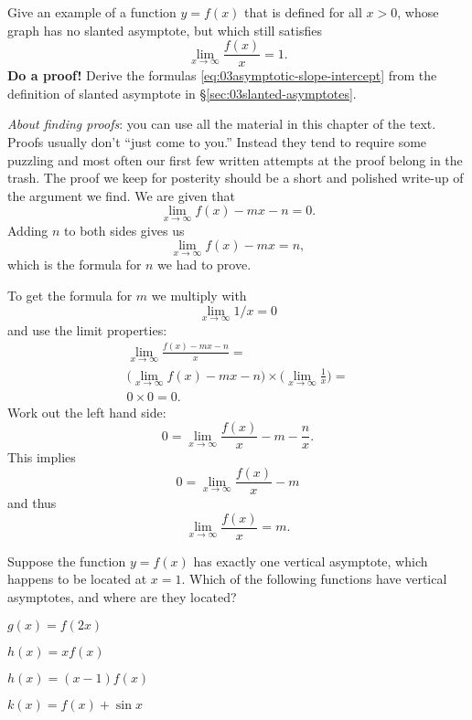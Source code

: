 \begin{multicols}{2}
\problem Give an example of a function $y=f(x)$ that is defined for 
all $x>0$, whose graph has no slanted asymptote, but which still satisfies
\[
\lim_{x\to\infty} \frac{f(x)}{x} = 1.
\]
\problem \textbf{Do a proof!}  Derive the formulas 
\eqref{eq:03asymptotic-slope-intercept}
\label{ex:prove-asymptotic-slope-intercept}
from the definition of slanted asymptote in
\S\ref{sec:03slanted-asymptotes}.

\textit{About finding proofs}:  you can use all the material in this chapter of
the text.  Proofs usually don't ``just come to you.'' Instead they tend to
require some puzzling and most often our first few written attempts at the proof
belong in the trash.  The proof we keep for posterity should be a short and
polished write-up of the argument we find.
\answer 
We are given that
\[
\lim_{x\to\infty} f(x) - mx-n = 0.
\]
Adding $n$ to both sides gives us
\[
\lim_{x\to\infty} f(x) -mx = n,
\]
which is the formula for $n$ we had to prove.

To get the formula for $m$ we multiply with
\[
\lim_{x\to\infty} 1/x =
0
\]
and use the limit properties:
\begin{multline*}
  \lim_{x\to\infty} \frac{f(x)-mx-n}{x} = \\
  \bigl(\lim_{x\to\infty} f(x)-mx-n\bigr)\times
  \bigl(\lim_{x\to\infty}\frac{1}{x}\bigr)=\\
  0\times0 = 0.
\end{multline*}
Work out the left hand side:
\[
0 = \lim_{x\to\infty} \frac{f(x)}{x} - m - \frac{n}{x}.
\]
This implies
\[
0 = \lim_{x\to\infty} \frac{f(x)}{x} - m
\]
and thus
\[
\lim_{x\to\infty} \frac{f(x)}{x} = m.
\]

\endanswer
\problem Suppose the function $y=f(x)$ has exactly one vertical 
asymptote, which happens to be located at $x=1$.  
Which of the following functions have vertical asymptotes, and where
are they located?

\subprob  $g(x) = f(2x)$

\subprob  $h(x) = xf(x)$

\subprob  $h(x) = (x-1)f(x)$

\subprob  $k(x) = f(x)+\sin x$

\end{multicols}
\noproblemfont

